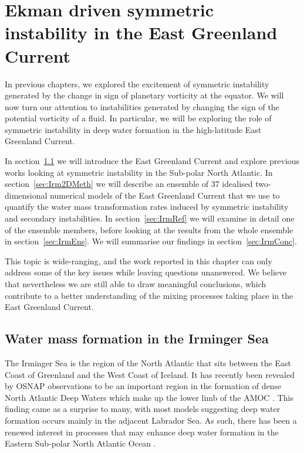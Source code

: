 \chapter{Ekman driven symmetric instability in the East Greenland Current}
\label{chap:5}

In previous chapters, we explored the excitement of symmetric instability generated by the change in sign of planetary vorticity at the equator. We will now turn our attention to instabilities generated by changing the sign of the potential vorticity of a fluid. In particular, we will be exploring the role of symmetric instability in deep water formation in the high-latitude East Greenland Current.

In section~\ref{sec:IrmIntro} we will introduce the East Greenland Current and explore previous works looking at symmetric instability in the Sub-polar North Atlantic. In section~\ref{sec:Irm2DMeth} we will describe an ensemble of 37 idealised two-dimensional numerical models of the East Greenland Current that we use to quantify the water mass transformation rates induced by symmetric instability and secondary instabilities. In section~\ref{sec:IrmRef} we will examine in detail one of the ensemble members, before looking at the results from the whole ensemble in section~\ref{sec:IrmEns}. We will summarise our findings in section~\ref{sec:IrmConc}.

This topic is wide-ranging, and the work reported in this chapter can only address some of the key issues while leaving questions unanswered. We believe that nevertheless we are still able to draw meaningful conclusions, which contribute to a better understanding of the mixing processes taking place in the East Greenland Current.

\section{Water mass formation in the Irminger Sea}
\label{sec:IrmIntro}
The Irminger Sea is the region of the North Atlantic that sits between the East Coast of Greenland and the West Coast of Iceland. It has recently been revealed by OSNAP observations to be an important region in the formation of dense North Atlantic Deep Waters which make up the lower limb of the AMOC \citep{Lozier2019}. This finding came as a surprise to many, with most models suggesting deep water formation occurs mainly in the adjacent Labrador Sea. As such, there has been a renewed interest in processes that may enhance deep water formation in the Eastern Sub-polar North Atlantic Ocean \citep[e.g.][]{Josey2019, LeBras2022, DeJong2016}.

